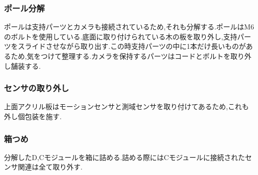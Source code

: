 \subsubsection{ポール分解}
ポールは支持パーツとカメラも接続されているため,それも分解する.ポールはM6のボルトを使用している.底面に取り付けられている木の板を取り外し,支持パーツをスライドさせながら取り出す.この時支持パーツの中に1本だけ長いものがあるため,気をつけて整理する.カメラを保持するパーツはコードとボルトを取り外し舗装する.

\subsubsection{センサの取り外し}
上面アクリル板はモーションセンサと測域センサを取り付けてあるため,これも外し個包装を施す.

\subsubsection{箱つめ}
分解したD,Cモジュールを箱に詰める.詰める際にはCモジュールに接続されたセンサ関連は全て取り外す.

